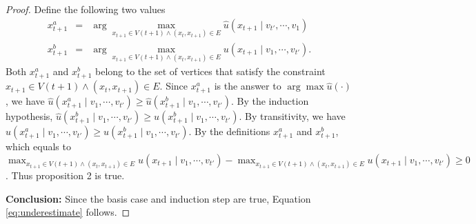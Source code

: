\begin{proof}
Define the following two values
\begin{eqnarray*}
x^{a}_{t+1} &=& \arg \max_{ x_{t+1} \in V(t+1) \land ( x_{t}, x_{t+1} ) \in E} \hat{u}( x_{t+1} \mid v_{t'} , \cdots , v_{1} )\\
x^{b}_{t+1} &=& \arg \max_{ x_{t+1} \in V(t+1) \land ( x_{t}, x_{t+1}) \in E } u( x_{t+1} \mid v_{1} , \cdots , v_{t'} ). 
\end{eqnarray*}
Both $ x^{a}_{t+1} $ and $ x^{b}_{t+1} $ belong to the set of vertices that satisfy the constraint $ x_{t+1} \in V(t+1) \land (x_{t}, x_{t+1}) \in E $.
Since $ x^{a}_{t+1} $ is the answer to $ \arg \max \hat{u}(\cdot) $, we have
$ \hat{u}( x^{a}_{t+1} \mid v_{1} , \cdots , v_{t'} ) \geq \hat{u}( x^{b}_{t+1} \mid v_{1} , \cdots , v_{t'} ) $.
By the induction hypothesis, $ \hat{u}( x^{b}_{t+1} \mid v_{1} , \cdots , v_{t'} ) \geq u( x^{b}_{t+1} \mid v_{1} , \cdots , v_{t'} ) $.
By transitivity, we have $  \hat{u}( x^{a}_{t+1} \mid v_{1} , \cdots , v_{t'} ) \geq  u ( x^{b}_{t+1} \mid v_{1} , \cdots , v_{t'} ) $.
By the definitions $ x^{a}_{t+1} $ and $ x^{b}_{t+1} $, 
which equals to 
$ \max_{ x_{t+1} \in V(t+1) \land ( x_{t}, x_{t+1} ) \in E } \hat{u}( x_{t+1} \mid v_{1} , \cdots , v_{t'} )  
 - \max_{x_{t+1} \in V(t+1) \land ( x_{t}, x_{t+1} ) \in E } u( x_{t+1} \mid v_{1} , \cdots , v_{t'} ) \geq 0 $.
Thus proposition 2 is true.

{\bf Conclusion:} Since the basis case and induction step are true, Equation \eqref{eq:underestimate} follows.
\end{proof}

